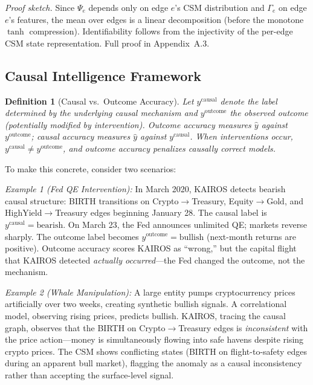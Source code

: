\documentclass[11pt]{article}
\newtheorem{definition}{Definition}
\begin{document}
\emph{Proof sketch.} Since $\Psi_e$ depends only on edge $e$'s CSM distribution and $\Gamma_e$ on edge $e$'s features, the mean over edges is a linear decomposition (before the monotone $\tanh$ compression). Identifiability follows from the injectivity of the per-edge CSM state representation. Full proof in Appendix~A.3.

\subsection{Causal Intelligence Framework}

\begin{definition}[Causal vs.\ Outcome Accuracy]
\label{def:causal_acc}
Let $y^{\text{causal}}$ denote the label determined by the underlying causal mechanism and $y^{\text{outcome}}$ the observed outcome (potentially modified by intervention). \emph{Outcome accuracy} measures $\hat{y}$ against $y^{\text{outcome}}$; \emph{causal accuracy} measures $\hat{y}$ against $y^{\text{causal}}$. When interventions occur, $y^{\text{causal}} \neq y^{\text{outcome}}$, and outcome accuracy penalizes causally correct models.
\end{definition}

To make this concrete, consider two scenarios:

\emph{Example 1 (Fed QE Intervention):} In March 2020, KAIROS detects bearish causal structure: BIRTH transitions on Crypto$\to$Treasury, Equity$\to$Gold, and HighYield$\to$Treasury edges beginning January 28. The causal label is $y^{\text{causal}} = \text{bearish}$. On March 23, the Fed announces unlimited QE; markets reverse sharply. The outcome label becomes $y^{\text{outcome}} = \text{bullish}$ (next-month returns are positive). Outcome accuracy scores KAIROS as ``wrong,'' but the capital flight that KAIROS detected \emph{actually occurred}---the Fed changed the outcome, not the mechanism.

\emph{Example 2 (Whale Manipulation):} A large entity pumps cryptocurrency prices artificially over two weeks, creating synthetic bullish signals. A correlational model, observing rising prices, predicts bullish. KAIROS, tracing the causal graph, observes that the BIRTH on Crypto$\to$Treasury edges is \emph{inconsistent} with the price action---money is simultaneously flowing into safe havens despite rising crypto prices. The CSM shows conflicting states (BIRTH on flight-to-safety edges during an apparent bull market), flagging the anomaly as a causal inconsistency rather than accepting the surface-level signal.
\end{document}
